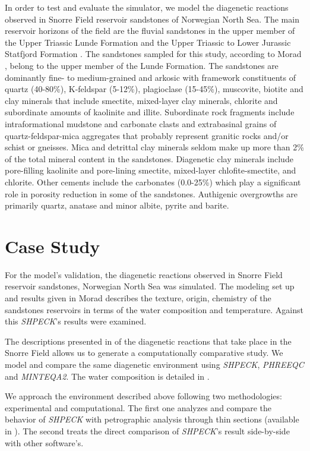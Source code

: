 In order to test and evaluate the simulator, we model the diagenetic reactions observed in Snorre Field reservoir sandstones of Norwegian North Sea. The main reservoir horizons of the field are the fluvial sandstones in the upper member of the Upper Triassic Lunde Formation and the Upper Triassic to Lower Jurassic Statfjord Formation \cite{Hollander:87}. The sandstones sampled for this study, according to Morad \cite{Morad:90}, belong to the upper member of the Lunde Formation. The sandstones are dominantly fine- to medium-grained and arkosic with framework constituents of quartz (40-80\%), K-feldspar (5-12\%), plagioclase (15-45\%), muscovite, biotite and clay minerals that include smectite, mixed-layer clay minerals, chlorite and subordinate amounts of kaolinite and illite. Subordinate rock fragments include intraformational mudstone and carbonate clasts and extrabasinal grains of quartz-feldspar-mica aggregates that probably represent granitic rocks and/or schist or gneisses. Mica and detrittal clay minerals seldom make up more than 2\% of the total mineral content in the sandstones. Diagenetic clay minerals include pore-filling kaolinite and pore-lining smectite, mixed-layer chlofite-smectite, and chlorite. Other cements include the carbonates (0.0-25\%) which play a significant role in porosity reduction in some of the sandstones. Authigenic overgrowths are primarily quartz, anatase and minor albite, pyrite and barite.

\section{Case Study}
For the model’s validation, the diagenetic reactions observed in Snorre Field reservoir sandstones, Norwegian North Sea was simulated. The modeling set up and results given in Morad \cite{Morad:90} describes the texture, origin, chemistry of the sandstones reservoirs in terms of the water composition and temperature. Against this \emph{SHPECK}'s results were examined.

The descriptions presented in \cite{Morad:90} of the diagenetic reactions that take place in the Snorre Field allows us to generate a computationally comparative study. We model and compare the same diagenetic environment using \emph{SHPECK}, \emph{PHREEQC} and \emph{MINTEQA2}. The water composition is detailed in \cite{Nordstrom:79}.

We approach the environment described above following two methodologies: experimental and computational. The first one analyzes and compare the behavior of \emph{SHPECK} with petrographic analysis through thin sections (available in \cite{Morad:90}). The second treats the direct comparison of \emph{SHPECK}'s result side-by-side with other software's.

